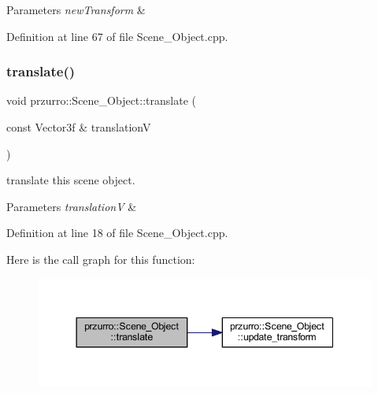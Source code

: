 \begin{DoxyParams}{Parameters}
{\em new\+Transform} & \\
\hline
\end{DoxyParams}


Definition at line 67 of file Scene\+\_\+\+Object.\+cpp.

\mbox{\label{classprzurro_1_1_scene___object_ac09d33f77a144de396414f36fb11f901}} 
\subsubsection{\texorpdfstring{translate()}{translate()}}
{\footnotesize\ttfamily void przurro\+::\+Scene\+\_\+\+Object\+::translate (\begin{DoxyParamCaption}\item[{const Vector3f \&}]{translationV }\end{DoxyParamCaption})}



translate this scene object. 


\begin{DoxyParams}{Parameters}
{\em translationV} & \\
\hline
\end{DoxyParams}


Definition at line 18 of file Scene\+\_\+\+Object.\+cpp.

Here is the call graph for this function\+:
\nopagebreak
\begin{figure}[H]
\begin{center}
\leavevmode
\includegraphics[width=344pt]{d9/d84/classprzurro_1_1_scene___object_ac09d33f77a144de396414f36fb11f901_cgraph}
\end{center}
\end{figure}
\mbox{\label{classprzurro_1_1_scene___object_aa995f210f23d6e36477c6745cd3bb097}} 
